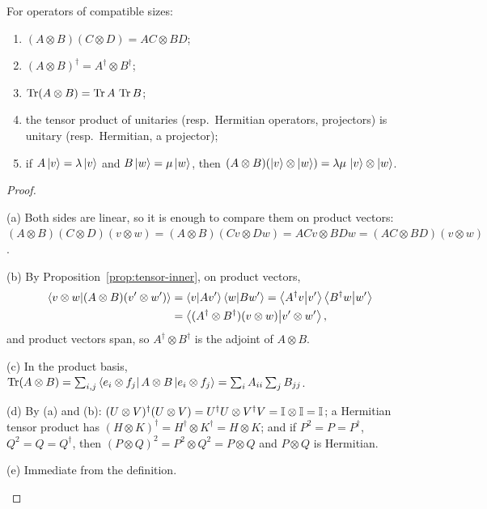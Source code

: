 \begin{proposition}\label{prop:tensor-rules}
  For operators of compatible sizes:
  \begin{enumerate}
    \item[(a)] $(A\otimes B)(C\otimes D)=AC\otimes BD$;
    \item[(b)] $(A\otimes B)^\dagger=A^\dagger\otimes B^\dagger$;
    \item[(c)] $\operatorname{Tr}(A\otimes B)=\operatorname{Tr} A\,\operatorname{Tr} B$;
    \item[(d)] the tensor product of unitaries (resp.\ Hermitian operators, projectors) is unitary (resp.\ Hermitian, a projector);
    \item[(e)] if $A\left|v\right\rangle=\lambda\left|v\right\rangle$ and $B\left|w\right\rangle=\mu\left|w\right\rangle$, then $(A\otimes B)(\left|v\right\rangle\otimes\left|w\right\rangle)=\lambda\mu\,\left|v\right\rangle\otimes\left|w\right\rangle$.
  \end{enumerate}
\end{proposition}
\begin{proof}
  \begin{steps}
    \item (a) Both sides are linear, so it is enough to compare them on product vectors: $(A\otimes B)(C\otimes D)(v\otimes w)=(A\otimes B)(Cv\otimes Dw)=ACv\otimes BDw=(AC\otimes BD)(v\otimes w)$.
    \item (b) By Proposition~\ref{prop:tensor-inner}, on product vectors,
      \[
        \begin{aligned}
          \left\langle v\otimes w\middle|(A\otimes B)(v'\otimes w')\right\rangle&=\left\langle v\middle|Av'\right\rangle\left\langle w\middle|Bw'\right\rangle=\left\langle A^\dagger v\middle|v'\right\rangle\left\langle B^\dagger w\middle|w'\right\rangle\\
          &=\left\langle(A^\dagger\otimes B^\dagger)(v\otimes w)\middle|v'\otimes w'\right\rangle,
        \end{aligned}
      \]
      and product vectors span, so $A^\dagger\otimes B^\dagger$ is the adjoint of $A\otimes B$.
    \item (c) In the product basis, $\operatorname{Tr}(A\otimes B)=\sum_{i,j}\left\langle e_i\otimes f_j\right|A\otimes B\left|e_i\otimes f_j\right\rangle=\sum_iA_{ii}\sum_jB_{jj}$.
    \item (d) By (a) and (b): $(U\otimes V)^\dagger(U\otimes V)=U^\dagger U\otimes V^\dagger V=\mathbb{I}\otimes\mathbb{I}=\mathbb{I}$; a Hermitian tensor product has $(H\otimes K)^\dagger=H^\dagger\otimes K^\dagger=H\otimes K$; and if $P^2=P=P^\dagger$, $Q^2=Q=Q^\dagger$, then $(P\otimes Q)^2=P^2\otimes Q^2=P\otimes Q$ and $P\otimes Q$ is Hermitian.
    \item (e) Immediate from the definition. \qedhere
  \end{steps}
\end{proof}

